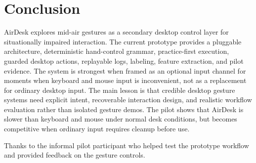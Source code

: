 \documentclass[manuscript]{acmart}
\begin{document}
\section{Conclusion}

AirDesk explores mid-air gestures as a secondary desktop control layer for situationally impaired interaction. The current prototype provides a pluggable architecture, deterministic hand-control grammar, practice-first execution, guarded desktop actions, replayable logs, labeling, feature extraction, and pilot evidence. The system is strongest when framed as an optional input channel for moments when keyboard and mouse input is inconvenient, not as a replacement for ordinary desktop input. The main lesson is that credible desktop gesture systems need explicit intent, recoverable interaction design, and realistic workflow evaluation rather than isolated gesture demos. The pilot shows that AirDesk is slower than keyboard and mouse under normal desk conditions, but becomes competitive when ordinary input requires cleanup before use.

\begin{acks}
Thanks to the informal pilot participant who helped test the prototype workflow and provided feedback on the gesture controls.
\end{acks}



\end{document}
